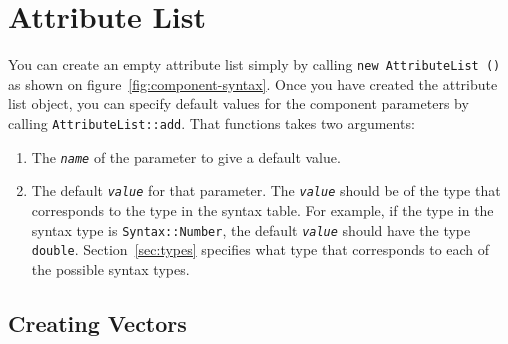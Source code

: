 \documentclass{article}
\newcommand{\cplusplus}%
{{\leavevmode{\rm{\hbox{C\hskip -0.1ex\raise 0.5ex\hbox{\tiny ++}}}}}}
\newcommand{\code}[1]{\texttt{#1}}
\begin{document}
\section{Attribute List}
\label{sec:alist}

You can create an empty attribute list simply by calling
\code{new~AttributeList~()} as shown on
figure~\ref{fig:component-syntax}.  Once you have created the
attribute list object, you can specify default values for the
component parameters by calling \code{AttributeList::add}. That
functions takes two arguments:
\begin{enumerate}
\item The \texttt{\emph{name}} of the parameter to give a default
  value. 
\item The default \texttt{\emph{value}} for that parameter.  The
  \texttt{\emph{value}} should be of the type that corresponds to the
  type in the syntax table.  For example, if the type in the syntax
  type is \code{Syntax::Number}, the default \texttt{\emph{value}}
  should have the type \code{double}.  Section~\ref{sec:types}
  specifies what \cplusplus{} type that corresponds to each of the
  possible syntax types.
\end{enumerate}

\subsection{Creating Vectors}
\end{document}
